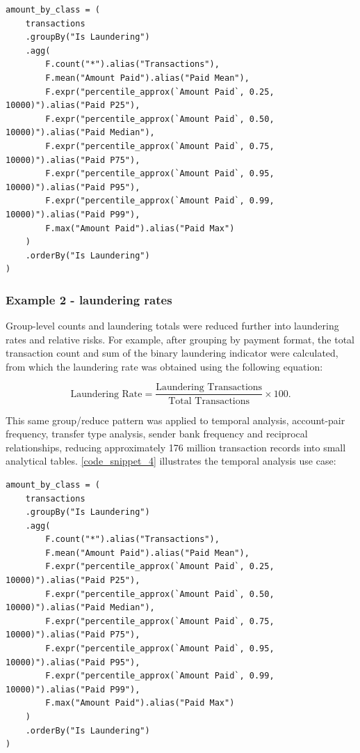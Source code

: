\begin{lstlisting}[caption={PySpark Statistics Reduction Aggregation}, label={code_snippet_3}]
amount_by_class = (
    transactions
    .groupBy("Is Laundering")
    .agg(
        F.count("*").alias("Transactions"),
        F.mean("Amount Paid").alias("Paid Mean"),
        F.expr("percentile_approx(`Amount Paid`, 0.25, 10000)").alias("Paid P25"),
        F.expr("percentile_approx(`Amount Paid`, 0.50, 10000)").alias("Paid Median"),
        F.expr("percentile_approx(`Amount Paid`, 0.75, 10000)").alias("Paid P75"),
        F.expr("percentile_approx(`Amount Paid`, 0.95, 10000)").alias("Paid P95"),
        F.expr("percentile_approx(`Amount Paid`, 0.99, 10000)").alias("Paid P99"),
        F.max("Amount Paid").alias("Paid Max")
    )
    .orderBy("Is Laundering")
)
\end{lstlisting}

\subsubsection{Example 2 - laundering rates}

Group-level counts and laundering totals were reduced further into laundering rates and relative risks. For example, after grouping by payment format, the total transaction count and sum of the binary laundering indicator were calculated, from which the laundering rate was obtained using the following equation:

\[\text{Laundering Rate} = \frac{\text{Laundering Transactions}}{\text{Total Transactions}} \times 100.\]

This same group/reduce pattern was applied to temporal analysis, account-pair frequency, transfer type analysis, sender bank frequency and reciprocal relationships, reducing approximately 176 million transaction records into small analytical tables. \autoref{code_snippet_4} illustrates the temporal analysis use case:

\begin{lstlisting}[caption={PySpark Statistics Reduction Aggregation}, label={code_snippet_4}]
amount_by_class = (
    transactions
    .groupBy("Is Laundering")
    .agg(
        F.count("*").alias("Transactions"),
        F.mean("Amount Paid").alias("Paid Mean"),
        F.expr("percentile_approx(`Amount Paid`, 0.25, 10000)").alias("Paid P25"),
        F.expr("percentile_approx(`Amount Paid`, 0.50, 10000)").alias("Paid Median"),
        F.expr("percentile_approx(`Amount Paid`, 0.75, 10000)").alias("Paid P75"),
        F.expr("percentile_approx(`Amount Paid`, 0.95, 10000)").alias("Paid P95"),
        F.expr("percentile_approx(`Amount Paid`, 0.99, 10000)").alias("Paid P99"),
        F.max("Amount Paid").alias("Paid Max")
    )
    .orderBy("Is Laundering")
)
\end{lstlisting}

